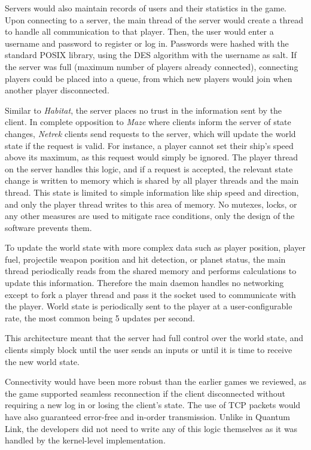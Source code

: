 Servers would also maintain records of users and their statistics in the game. Upon connecting to a server, the main thread of the server would create a thread to handle all communication to that player. Then, the user would enter a username and password to register or log in. Passwords were hashed with the standard POSIX  library, using the DES algorithm with the username as salt. If the server was full (maximum number of players already connected), connecting players could be placed into a queue, from which new players would join when another player disconnected.

Similar to \textit{Habitat}, the server places no trust in the information sent by the client. In complete opposition to \textit{Maze} where clients inform the server of state changes, \textit{Netrek} clients send requests to the server, which will update the world state if the request is valid. For instance, a player cannot set their ship's speed above its maximum, as this request would simply be ignored. The player thread on the server handles this logic, and if a request is accepted, the relevant state change is written to memory which is shared by all player threads and the main thread. This state is limited to simple information like ship speed and direction, and only the player thread writes to this area of memory. No mutexes, locks, or any other measures are used to mitigate race conditions, only the design of the software prevents them.

To update the world state with more complex data such as player position, player fuel, projectile weapon position and hit detection, or planet status, the main thread periodically reads from the shared memory and performs calculations to update this information. Therefore the main daemon handles no networking except to fork a player thread and pass it the socket used to communicate with the player. World state is periodically sent to the player at a user-configurable rate, the most common being 5 updates per second.

This architecture meant that the server had full control over the world state, and clients simply block until the user sends an inputs or until it is time to receive the new world state.

Connectivity would have been more robust than the earlier games we reviewed, as the game supported seamless reconnection if the client disconnected without requiring a new log in or losing the client's state. The use of TCP packets would have also guaranteed error-free and in-order transmission. Unlike in Quantum Link, the developers did not need to write any of this logic themselves as it was handled by the kernel-level implementation.

